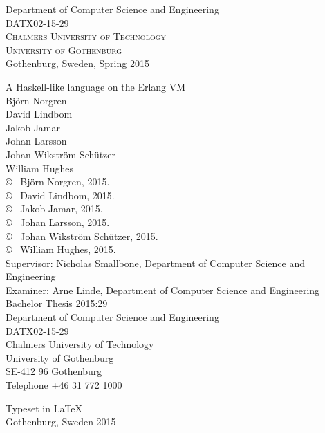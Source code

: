 \begin{center}
	Department of Computer Science and Engineering \\
	DATX02-15-29\\
	\textsc{Chalmers University of Technology} \\
	\textsc{University of Gothenburg} \\
	Gothenburg, Sweden, Spring 2015 \\
\end{center}


\newpage
\thispagestyle{plain}
\vspace*{4.5cm}
A Haskell-like language on the Erlang VM\\
Björn Norgren\\[0.5cm]
David Lindbom\\[0.5cm]
Jakob Jamar\\[0.5cm]
Johan Larsson\\[0.5cm]
Johan Wikström Schützer\\[0.5cm]
William Hughes\\[0.5cm]

\copyright ~ Björn Norgren, 2015.\\[0.5cm]
\copyright ~ David Lindbom, 2015.\\[0.5cm]
\copyright ~ Jakob Jamar, 2015.\\[0.5cm]
\copyright ~ Johan Larsson, 2015.\\[0.5cm]
\copyright ~ Johan Wikström Schützer, 2015.\\[0.5cm]
\copyright ~ William Hughes, 2015.\\[0.5cm]

Supervisor: Nicholas Smallbone, Department of Computer Science and Engineering\\
Examiner: Arne Linde, Department of Computer Science and Engineering\\[0.5cm]

Bachelor Thesis 2015:29\\
Department of Computer Science and Engineering\\
DATX02-15-29\\
Chalmers University of Technology\\
University of Gothenburg\\
SE-412 96 Gothenburg\\
Telephone +46 31 772 1000\\

\vfill

Typeset in \LaTeX \\
Gothenburg, Sweden 2015
